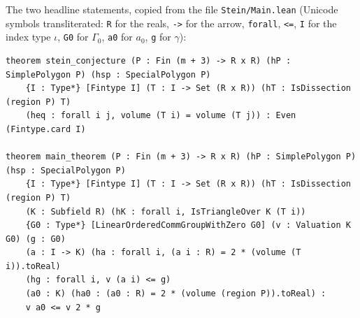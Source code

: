 \documentclass[11pt]{article}
\theoremstyle{definition}
\newcommand{\tL}[1]{\texttt{#1}}
\begin{document}
The two headline statements, copied from the file \tL{Stein/Main.lean} (Unicode
symbols transliterated: \tL{R} for the reals, \tL{->} for the arrow, \tL{forall}, \tL{<=}, \tL{I}
for the index type $\iota$, \tL{G0} for $\Gamma_0$, \tL{a0} for $a_0$, \tL{g} for $\gamma$):
{\footnotesize
\begin{verbatim}
theorem stein_conjecture (P : Fin (m + 3) -> R x R) (hP : SimplePolygon P) (hsp : SpecialPolygon P)
    {I : Type*} [Fintype I] (T : I -> Set (R x R)) (hT : IsDissection (region P) T)
    (heq : forall i j, volume (T i) = volume (T j)) : Even (Fintype.card I)

theorem main_theorem (P : Fin (m + 3) -> R x R) (hP : SimplePolygon P) (hsp : SpecialPolygon P)
    {I : Type*} [Fintype I] (T : I -> Set (R x R)) (hT : IsDissection (region P) T)
    (K : Subfield R) (hK : forall i, IsTriangleOver K (T i))
    {G0 : Type*} [LinearOrderedCommGroupWithZero G0] (v : Valuation K G0) (g : G0)
    (a : I -> K) (ha : forall i, (a i : R) = 2 * (volume (T i)).toReal)
    (hg : forall i, v (a i) <= g)
    (a0 : K) (ha0 : (a0 : R) = 2 * (volume (region P)).toReal) :
    v a0 <= v 2 * g
\end{verbatim}}
\end{document}
